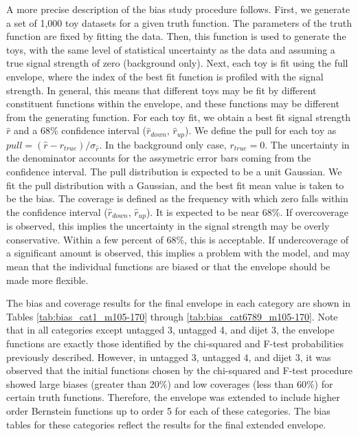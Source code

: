 A more precise description of the bias study procedure follows. First, we generate 
a set of 1,000 toy datasets for a given truth function. The parameters of the truth 
function are fixed by fitting the data. Then, this function is used to generate the toys, 
with the same level of statistical uncertainty as the data
and assuming a true signal strength of zero (background only). Next, each toy is fit using 
the full envelope, where the index of the best fit function is profiled with the 
signal strength. In general, this means that different toys may be fit by different 
constituent functions within the envelope, and these functions may be different from the generating function. 
For each toy fit, we obtain a best fit signal strength $\hat{r}$ and a 68\% confidence interval
($\hat{r}_{down}$, $\hat{r}_{up}$). We define the pull for each toy as 
$pull = (\hat{r}-r_{true})/\sigma_{\hat{r}}$. In the background only case, $r_{true} = 0$. 
The uncertainty in the denominator accounts for
the assymetric error bars coming from the confidence interval. The pull distribution is expected
to be a unit Gaussian. We fit the pull distribution with a Gaussian, and the best fit mean 
value is taken to be the bias. The coverage is defined as the frequency with which zero falls
within the confidence interval ($\hat{r}_{down}$, $\hat{r}_{up}$). It is expected to be 
near 68\%. If overcoverage is observed, this implies the uncertainty in the signal strength may 
be overly conservative. Within a few percent of 68\%, this is acceptable. If undercoverage of 
a significant amount is observed, this implies a problem with the model, and may mean that 
the individual functions are biased or that the envelope should be made more flexible. 

The bias and coverage results for the final envelope in each category 
are shown in Tables \ref{tab:bias_cat1_m105-170} through \ref{tab:bias_cat6789_m105-170}. 
Note that in all categories except untagged 3, untagged 4, and dijet 3, the envelope functions 
are exactly those identified by the chi-squared and F-test probabilities previously described.
However, in untagged 3, untagged 4, and dijet 3, it was observed that the initial functions chosen 
by the chi-squared and F-test procedure showed large biases (greater than 20\%) and low coverages (less than 60\%) for 
certain truth functions. Therefore, the envelope was extended to include higher order Bernstein functions up 
to order 5 for each of these categories. The bias tables for these categories reflect the results for the final 
extended envelope. 

